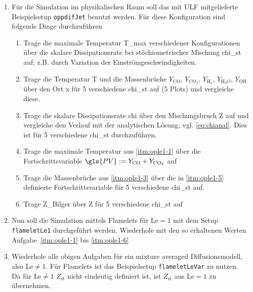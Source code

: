\begin{sloppypar} %
\begin{enumerate}
    \item Für die Simulation im physikalischen Raum soll das mit \gls{ULF} mitgelieferte Beispielsetup \lstinline!oppdifJet! benutzt werden. Für diese Konfiguration sind folgende Dinge durchzuführen
    \begin{enumerate}
        \item \label{itm:ople1-1}
        Trage die maximale Temperatur \gls{T_max} verschiedener Konfigurationen über die skalare Dissipationsrate bei stöchiometrischer Mischung \gls{chi_st} auf; z.B. durch Variation der Einströmgeschwindigkeiten.

        \item \label{itm:ople1-3}
        Trage die Temperatur \gls{T} und die Massenbrüche $Y_{\mathrm{CO}}$, $Y_{\mathrm{CO}_2}$, $Y_{\mathrm{H}_2}$, $Y_{\mathrm{H}_2O}$, $Y_{\mathrm{OH}}$ über den Ort \gls{x} für 5 verschiedene \gls{chi_st} auf (5 Plots) und vergleiche diese.

        \item \label{itm:ople1-4}
        Trage die skalare Dissipationsrate \gls{chi} über den Mischungsbruch \gls{Z} auf und vergleiche den Verlauf mit der analytischen Lösung, vgl. \autoref{eq:chianal}. Dies ist für 5 verschiedene \gls{chi_st} durchzuführen.

        \item \label{itm:ople1-5}
        Trage die maximale Temperatur aus \ref{itm:ople1-1} über die Fortschrittsvariable $\gls{PV}:=Y_\mathrm{CO}+Y_{\mathrm{CO}_2}$ auf

        \item \label{itm:ople1-6}
        Trage die Massenbrüche aus \ref{itm:ople1-3} über die in \ref{itm:ople1-5} definierte Fortschrittsvariable für 5 verschiedene \gls{chi_st} auf.

        \item \label{itm:ople1-7}
        Trage \gls{Z_Bilger} über \gls{Z} für 5 verschiedene \gls{chi_st} auf
    \end{enumerate}
    \item Nun soll die Simulation mittels Flamelets für $\mathrm{Le}=1$ mit dem Setup \lstinline!flameletLe1! durchgeführt werden. Wiederhole mit den so erhaltenen Werten Aufgabe~\ref{itm:ople1-1} bis \ref{itm:ople1-6}
    \item Wiederhole alle obigen Aufgaben für ein mixture averaged Diffusionsmodell, also $\mathrm{Le}\neq 1$. Für Flamelets ist das Beispielsetup \lstinline!flameletLeVar! zu nutzen. Da für $\mathrm{Le}\neq 1$ $Z_\mathrm{st}$ nicht eindeutig definiert ist, ist $Z_\mathrm{st}$ aus $\mathrm{Le}=1$ zu übernehmen.
\end{enumerate}
\end{sloppypar}
